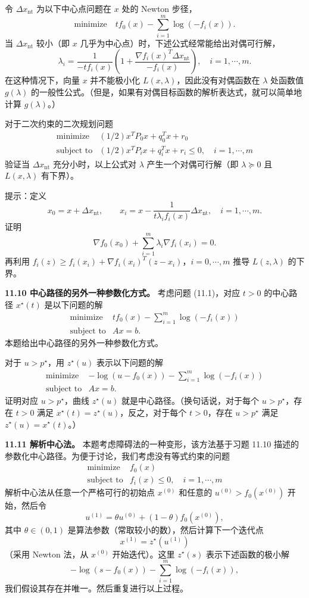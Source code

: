 \documentclass[UTF8,12pt,a4paper,fontset=fandol]{ctexart}
\begin{document}
令 $\Delta x_{\mathrm{nt}}$ 为以下中心点问题在 $x$ 处的 Newton 步径，
\[
\text{minimize}\quad tf_0(x)-\sum_{i=1}^m\log(-f_i(x)).
\]
当 $\Delta x_{\mathrm{nt}}$ 较小（即 $x$ 几乎为中心点）时，下述公式经常能给出对偶可行解，
\[
\lambda_i=\frac{1}{-tf_i(x)}\left(1+\frac{\nabla f_i(x)^T\Delta x_{\mathrm{nt}}}{-f_i(x)}\right),\quad i=1,\cdots,m.
\]
在这种情况下，向量 $x$ 并不能极小化 $L(x,\lambda)$，因此没有对偶函数在 $\lambda$ 处函数值 $g(\lambda)$ 的一般性公式。（但是，如果有对偶目标函数的解析表达式，就可以简单地计算 $g(\lambda)$。）

对于二次约束的二次规划问题
\[
\begin{array}{ll}
\text{minimize} & (1/2)x^TP_0x+q_0^Tx+r_0\\
\text{subject to} & (1/2)x^TP_ix+q_i^Tx+r_i\leq 0,\quad i=1,\cdots,m
\end{array}
\]
验证当 $\Delta x_{\mathrm{nt}}$ 充分小时，以上公式对 $\lambda$ 产生一个对偶可行解（即 $\lambda\succeq 0$ 且 $L(x,\lambda)$ 有下界）。

提示：定义
\[
x_0=x+\Delta x_{\mathrm{nt}},\qquad x_i=x-\frac{1}{t\lambda_i f_i(x)}\Delta x_{\mathrm{nt}},\quad i=1,\cdots,m.
\]
证明
\[
\nabla f_0(x_0)+\sum_{i=1}^m \lambda_i\nabla f_i(x_i)=0.
\]
再利用 $f_i(z)\geq f_i(x_i)+\nabla f_i(x_i)^T(z-x_i)$，$i=0,\cdots,m$ 推导 $L(z,\lambda)$ 的下界。

\noindent\textbf{11.10 中心路径的另外一种参数化方式。} 考虑问题 (11.1)，对应 $t>0$ 的中心路径 $x^\star(t)$ 是以下问题的解
\[
\begin{array}{ll}
\text{minimize} & tf_0(x)-\displaystyle\sum_{i=1}^m\log(-f_i(x))\\
\text{subject to} & Ax=b.
\end{array}
\]
本题给出中心路径的另外一种参数化方式。

对于 $u>p^\star$，用 $z^\star(u)$ 表示以下问题的解
\[
\begin{array}{ll}
\text{minimize} & -\log(u-f_0(x))-\displaystyle\sum_{i=1}^m\log(-f_i(x))\\
\text{subject to} & Ax=b.
\end{array}
\]
证明对应 $u>p^\star$，曲线 $z^\star(u)$ 就是中心路径。（换句话说，对于每个 $u>p^\star$，存在 $t>0$ 满足 $x^\star(t)=z^\star(u)$，反之，对于每个 $t>0$，存在 $u>p^\star$ 满足 $z^\star(u)=x^\star(t)$。）

\noindent\textbf{11.11 解析中心法。} 本题考虑障碍法的一种变形，该方法基于习题 11.10 描述的参数化中心路径。为便于讨论，我们考虑没有等式约束的问题
\[
\begin{array}{ll}
\text{minimize} & f_0(x)\\
\text{subject to} & f_i(x)\leq 0,\quad i=1,\cdots,m
\end{array}
\]
解析中心法从任意一个严格可行的初始点 $x^{(0)}$ 和任意的 $u^{(0)}>f_0(x^{(0)})$ 开始，然后令
\[
u^{(1)}=\theta u^{(0)}+(1-\theta)f_0(x^{(0)}),
\]
其中 $\theta\in(0,1)$ 是算法参数（常取较小的数），然后计算下一个迭代点
\[
x^{(1)}=z^\star(u^{(1)})
\]
（采用 Newton 法，从 $x^{(0)}$ 开始迭代）。这里 $z^\star(s)$ 表示下述函数的极小解
\[
-\log(s-f_0(x))-\sum_{i=1}^m\log(-f_i(x)),
\]
我们假设其存在并唯一。然后重复进行以上过程。
\end{document}
